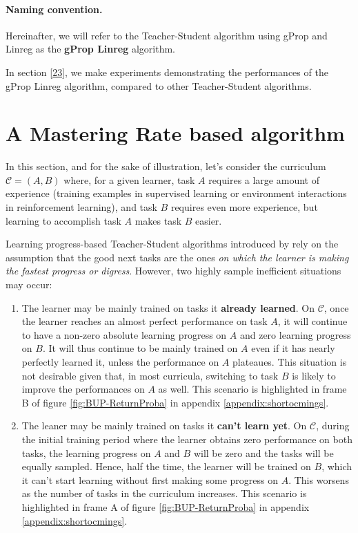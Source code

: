 \documentclass{article}
\begin{document}
\paragraph{Naming convention.} Hereinafter, we will refer to the Teacher-Student algorithm using gProp and Linreg as the \textbf{gProp Linreg} algorithm. 

In section \ref{23}, we make experiments demonstrating the performances of the gProp Linreg algorithm, compared to other Teacher-Student algorithms.


\section{A Mastering Rate based algorithm}
\label{section4}




\label{mr-algorithm}
In this section, and for the sake of illustration, let's consider the curriculum ${\mathcal{C} = (A, B)}$ where, for a given learner, task $A$ requires a large amount of experience (training examples in supervised learning or environment interactions in reinforcement learning), and task $B$ requires even more experience, but learning to accomplish task $A$ makes task $B$ easier. 

Learning progress-based Teacher-Student algorithms introduced by \citep{matiisen2017teacher} rely on the assumption that the good next tasks are the ones \textit{on which the learner is making the fastest progress or digress}. However, two highly sample inefficient situations may occur:
\begin{enumerate}
\item The learner may be mainly trained on tasks it \textbf{already learned}. On $\mathcal{C}$, once the learner reaches an almost perfect performance on task $A$, it will continue to have a non-zero absolute learning progress on $A$ and zero learning progress on $B$. It will thus continue to be mainly trained on $A$ even if it has nearly perfectly learned it, unless the performance on $A$ plateaues. This situation is not desirable given that, in most curricula, switching to task $B$ is likely to improve the performances on $A$ as well. This scenario is highlighted in frame B of figure \ref{fig:BUP-ReturnProba} in appendix \ref{appendix:shortocmings}.
\item The leaner may be mainly trained on tasks it \textbf{can't learn yet}. On $\mathcal{C}$, during the initial training period where the learner obtains zero performance on both tasks, the learning progress on $A$ and $B$ will be zero and the tasks will be equally sampled. Hence, half the time, the learner will be trained on $B$, which it can't start learning without first making some progress on $A$. This worsens as the number of tasks in the curriculum increases. This scenario is highlighted in frame A of figure \ref{fig:BUP-ReturnProba} in appendix \ref{appendix:shortocmings}.
\end{enumerate}
\end{document}
